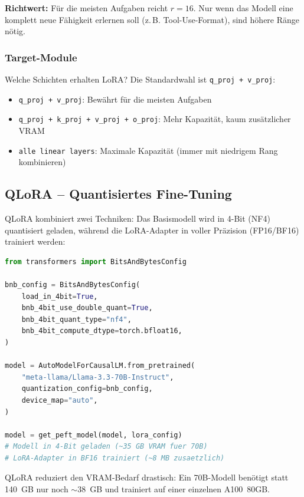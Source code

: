 \textbf{Richtwert:} Für die meisten Aufgaben reicht $r = 16$. Nur wenn das Modell eine komplett neue Fähigkeit erlernen soll (z.\,B. Tool-Use-Format), sind höhere Ränge nötig.

\subsubsection{Target-Module}

Welche Schichten erhalten LoRA? Die Standardwahl ist \texttt{q\_proj + v\_proj}:

\begin{itemize}[leftmargin=*]
    \item \texttt{q\_proj + v\_proj}: Bewährt für die meisten Aufgaben
    \item \texttt{q\_proj + k\_proj + v\_proj + o\_proj}: Mehr Kapazität, kaum zusätzlicher VRAM
    \item \texttt{alle linear layers}: Maximale Kapazität (immer mit niedrigem Rang kombinieren)
\end{itemize}

\subsection{QLoRA -- Quantisiertes Fine-Tuning}

QLoRA kombiniert zwei Techniken: Das Basismodell wird in 4-Bit (NF4) quantisiert geladen, während die LoRA-Adapter in voller Präzision (FP16/BF16) trainiert werden:

\begin{lstlisting}[language=Python, caption=QLoRA -- Fine-Tuning eines quantisierten Modells]
from transformers import BitsAndBytesConfig

bnb_config = BitsAndBytesConfig(
    load_in_4bit=True,
    bnb_4bit_use_double_quant=True,
    bnb_4bit_quant_type="nf4",
    bnb_4bit_compute_dtype=torch.bfloat16,
)

model = AutoModelForCausalLM.from_pretrained(
    "meta-llama/Llama-3.3-70B-Instruct",
    quantization_config=bnb_config,
    device_map="auto",
)

model = get_peft_model(model, lora_config)
# Modell in 4-Bit geladen (~35 GB VRAM fuer 70B)
# LoRA-Adapter in BF16 trainiert (~8 MB zusaetzlich)
\end{lstlisting}

QLoRA reduziert den VRAM-Bedarf drastisch: Ein 70B-Modell benötigt statt 140~GB nur noch \(\sim 38\)~GB und trainiert auf einer einzelnen A100~80GB.

